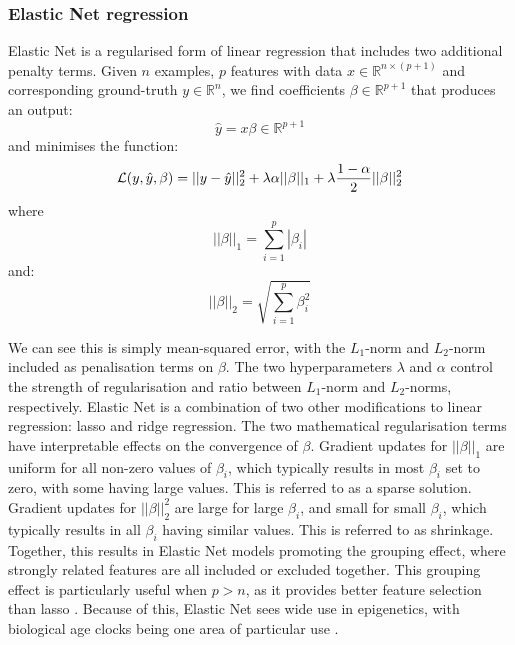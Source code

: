 \documentclass{article}
\newcommand{\equationname}[1]{%
    \begingroup
        \leavevmode
        \addcontentsline{equ}{equations}{\protect\numberline{\theequation}#1}%
    \endgroup   
}
\begin{document}
\subsubsection{Elastic Net regression}
Elastic Net \cite{zou2005regularization} is a regularised form of linear regression that includes two additional penalty terms.
Given \(n\) examples, \(p\) features with data \(x \in \mathbb{R}^{n \times (p + 1)}\) and corresponding ground-truth \(y \in \mathbb{R}^n\), we find coefficients \(\beta \in \mathbb{R}^{p + 1}\) that produces an output:
\[\hat{y} = x \beta \in \mathbb{R}^{p + 1}\]
and minimises the function:
\begin{equation} \equationname{Elastic Net linear regression}
    \mathcal{L}(y, \hat{y}, \beta) = ||y - \hat{y}||_2^2 + \lambda\alpha||\beta||_1 + \lambda\frac{1 - \alpha}{2}||\beta||_2^2
\end{equation}
where
\[||\beta||_1 = \sum_{i=1}^{p} |\beta_i|\]
and:
\[||\beta||_2 = \sqrt{\sum_{i=1}^{p} \beta_i^2}\]

We can see this is simply mean-squared error, with the \(L_1\)-norm and \(L_2\)-norm included as penalisation terms on \(\beta\). The two hyperparameters \(\lambda\) and \(\alpha\) control the strength of regularisation and ratio between \(L_1\)-norm and \(L_2\)-norms, respectively. Elastic Net is a combination of two other modifications to linear regression: lasso \cite{tibshirani1996regression} and ridge \cite{hoerl1970ridge} regression. The two mathematical regularisation terms have interpretable effects on the convergence of \(\beta\). Gradient updates for \(||\beta||_1\) are uniform for all non-zero values of \(\beta_i\), which typically results in most \(\beta_i\) set to zero, with some having large values. This is referred to as a sparse solution. Gradient updates for \(||\beta||_2^2\) are large for large \(\beta_i\), and small for small \(\beta_i\), which typically results in all \(\beta_i\) having similar values. This is referred to as shrinkage. Together, this results in Elastic Net models promoting the grouping effect, where strongly related features are all included or excluded together. This grouping effect is particularly useful when \(p > n\), as it provides better feature selection than lasso \cite{zou2005regularization}. Because of this, Elastic Net sees wide use in epigenetics, with biological age clocks being one area of particular use \cite{teschendorff2025epigenetic}.
\end{document}
